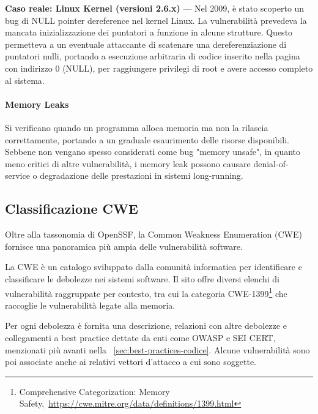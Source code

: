 \textbf{Caso reale: Linux Kernel (versioni 2.6.x)} — Nel 2009, è stato scoperto
un bug di NULL pointer dereference nel kernel Linux. La vulnerabilità prevedeva la
mancata inizializzazione dei puntatori a funzione in alcune strutture. Questo
permetteva a un eventuale attaccante di scatenare una dereferenziazione di
puntatori nulli, portando a esecuzione arbitraria di codice inserito nella pagina
con indirizzo 0 (NULL), per raggiungere privilegi di root e avere accesso
completo al sistema.~\cite{null_pointer_dereference_linux}

\paragraph{Memory Leaks}
\label{sec:memory_leaks} Si verificano quando un programma alloca memoria ma non
la rilascia correttamente, portando a un graduale esaurimento delle risorse
disponibili. Sebbene non vengano spesso considerati come bug "memory unsafe", in
quanto meno critici di altre vulnerabilità, i memory leak possono causare denial-of-service
o degradazione delle prestazioni in sistemi long-running.

\subsection{Classificazione CWE}
Oltre alla tassonomia di OpenSSF, la Common Weakness Enumeration (CWE) fornisce
una panoramica più ampia delle vulnerabilità software.

La CWE è un catalogo sviluppato dalla comunità informatica per identificare e
classificare le debolezze nei sistemi software. Il sito offre diversi elenchi di
vulnerabilità raggruppate per contesto, tra cui la categoria CWE-1399\footnote{Comprehensive
Categorization: Memory Safety,~\url{https://cwe.mitre.org/data/definitions/1399.html}}
che raccoglie le vulnerabilità legate alla memoria.

Per ogni debolezza è fornita una descrizione, relazioni con altre debolezze e
collegamenti a best practice dettate da enti come OWASP e SEI CERT, menzionati più
avanti nella ~\autoref{sec:best-practices-codice}. Alcune vulnerabilità sono poi
associate anche ai relativi vettori d'attacco a cui sono soggette.